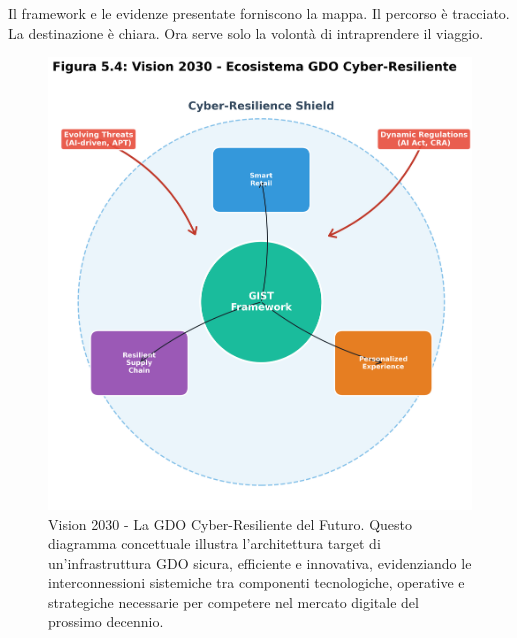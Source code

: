 Il framework e le evidenze presentate forniscono la mappa. Il percorso è tracciato. La destinazione è chiara. Ora serve solo la volontà di intraprendere il viaggio.

\begin{figure}[htbp]
\centering
\includegraphics[width=1\textwidth]{thesis_figures/cap5/figura_5_4_vision_2030_matplotlib.png}
\caption{Vision 2030 - La GDO Cyber-Resiliente del Futuro. Questo diagramma concettuale illustra l'architettura target di un'infrastruttura GDO sicura, efficiente e innovativa, evidenziando le interconnessioni sistemiche tra componenti tecnologiche, operative e strategiche necessarie per competere nel mercato digitale del prossimo decennio.}
\label{fig:vision_2030}
\end{figure}


